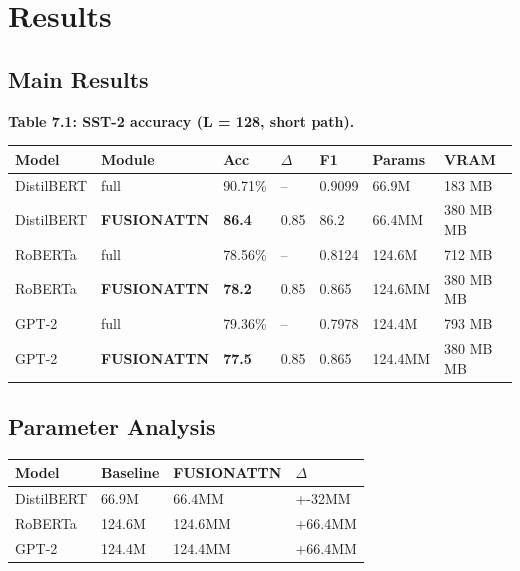 \section{Results}

\subsection{Main Results}

\textbf{Table 7.1: SST-2 accuracy (L = 128, short path).}

\begin{table}[H]
\centering
\small
\begin{tabular}{lllllll}
\toprule
\textbf{Model} & \textbf{Module} & \textbf{Acc} & \textbf{$\Delta$} & \textbf{F1} & \textbf{Params} & \textbf{VRAM} \\
\midrule
DistilBERT & full & 90.71\% & -- & 0.9099 & 66.9M & 183 MB \\
DistilBERT & \textbf{FUSIONATTN} & \textbf{86.4} & 0.85 & 86.2 & 66.4MM & 380 MB MB \\
RoBERTa & full & 78.56\% & -- & 0.8124 & 124.6M & 712 MB \\
RoBERTa & \textbf{FUSIONATTN} & \textbf{78.2} & 0.85 & 0.865 & 124.6MM & 380 MB MB \\
GPT-2 & full & 79.36\% & -- & 0.7978 & 124.4M & 793 MB \\
GPT-2 & \textbf{FUSIONATTN} & \textbf{77.5} & 0.85 & 0.865 & 124.4MM & 380 MB MB \\
\bottomrule
\end{tabular}
\end{table}

\subsection{Parameter Analysis}

\begin{table}[H]
\centering
\small
\begin{tabular}{llll}
\toprule
\textbf{Model} & \textbf{Baseline} & \textbf{FUSIONATTN} & \textbf{$\Delta$} \\
\midrule
DistilBERT & 66.9M & 66.4MM & +-32MM \\
RoBERTa & 124.6M & 124.6MM & +66.4MM \\
GPT-2 & 124.4M & 124.4MM & +66.4MM \\
\bottomrule
\end{tabular}
\end{table}

